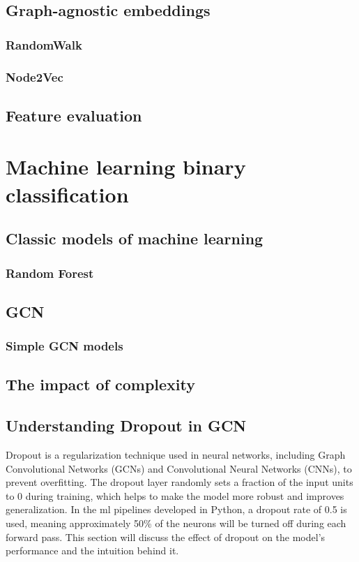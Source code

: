 \subsection{Graph-agnostic embeddings}

\subsubsection{RandomWalk}

\subsubsection{Node2Vec}

\subsection{Feature evaluation}

\section{Machine learning binary classification}

\subsection{Classic models of machine learning}

\subsubsection{Random Forest}

\subsection{GCN}

\subsubsection{Simple GCN models}

\subsection{The impact of complexity}

\subsection{Understanding Dropout in GCN}

Dropout is a regularization technique used in neural networks, including Graph Convolutional Networks (GCNs) and Convolutional Neural Networks (CNNs), to prevent overfitting. The dropout layer randomly sets a fraction of the input units to 0 during training, which helps to make the model more robust and improves generalization. In the \acrshort{ml} pipelines developed in Python, a dropout rate of 0.5 is used, meaning approximately 50\% of the neurons will be turned off during each forward pass. This section will discuss the effect of dropout on the model's performance and the intuition behind it.

